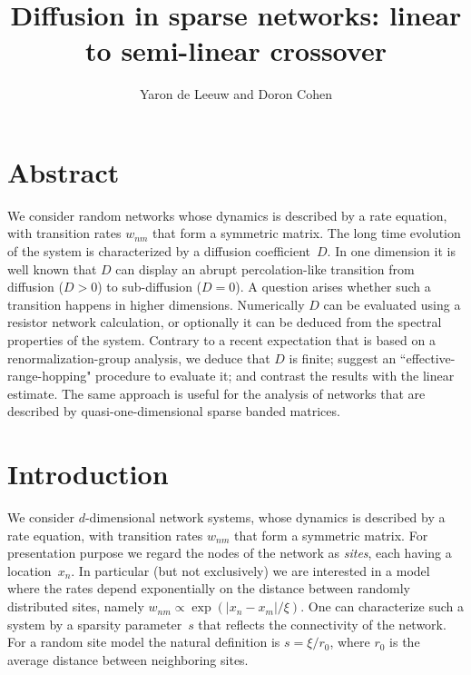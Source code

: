 \documentclass[onecolumn,fleqn,12pt,openany,draft]{book}
\begin{document}
\title{Diffusion in sparse networks: linear to semi-linear crossover}

\author{Yaron de Leeuw and Doron Cohen}


\section*{Abstract}
We consider random networks whose dynamics is
described by a rate equation, with transition rates $w_{nm}$
that form a symmetric matrix. The long time evolution
of the system is characterized by a diffusion coefficient~$D$.
In one dimension it is well known that $D$ can display an abrupt
percolation-like transition from diffusion (${D>0}$)
to sub-diffusion (${D=0}$). A question arises whether
such a transition happens in higher dimensions.
Numerically $D$ can be evaluated using a resistor network
calculation, or optionally it can be deduced from 
the spectral properties of the system. Contrary to a recent 
expectation that is based on a renormalization-group analysis, 
we deduce that $D$ is finite; 
suggest an ``effective-range-hopping" procedure to evaluate it;
and contrast the results with the linear estimate.
The same approach is useful for the analysis of 
networks that are described by quasi-one-dimensional  
sparse banded matrices. 



\maketitle


\section{Introduction}

We consider $d$-dimensional network systems, 
whose dynamics is described by a rate equation, 
with transition rates $w_{nm}$ that form a symmetric matrix.
For presentation purpose we regard the nodes of the network as {\em sites}, 
each having a location~$x_n$. In particular (but not exclusively) we are interested 
in a model where the rates depend exponentially on the distance 
between randomly distributed sites, namely $w_{nm}\propto \exp(|x_n-x_m|/\xi)$. 
One can characterize such a system by a sparsity parameter~$s$ 
that reflects the connectivity of the network. For a random site model
the natural definition is $s=\xi/r_0$, where $r_0$ is the average distance 
between neighboring sites. 
\end{document}
